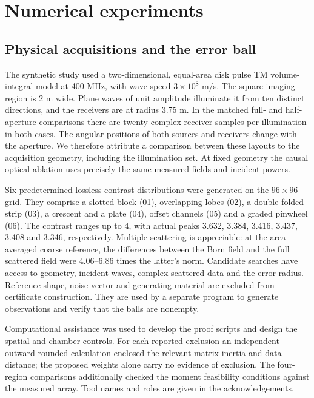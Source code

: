 \documentclass[anonymous,12pt]{iopjournal}
\theoremstyle{remark}\newtheorem{remark}[theorem]{Remark}
\numberwithin{equation}{section}
\begin{document}
\section{Numerical experiments}\label{sec:exp}

\subsection{Physical acquisitions and the error ball}
The synthetic study used a two-dimensional, equal-area disk pulse TM volume-integral model at 400 MHz, with wave speed $3\times10^8$ m/s. The square imaging region is 2 m wide. Plane waves of unit amplitude illuminate it from ten distinct directions, and the receivers are at radius 3.75 m. In the matched full- and half-aperture comparisons there are twenty complex receiver samples per illumination in both cases. The angular positions of both sources and receivers change with the aperture. We therefore attribute a comparison between these layouts to the acquisition geometry, including the illumination set. At fixed geometry the causal optical ablation uses precisely the same measured fields and incident powers.

Six predetermined lossless contrast distributions were generated on the $96\times96$ grid. They comprise a slotted block (01), overlapping lobes (02), a double-folded strip (03), a crescent and a plate (04), offset channels (05) and a graded pinwheel (06). The contrast ranges up to 4, with actual peaks 3.632, 3.384, 3.416, 3.437, 3.408 and 3.346, respectively. Multiple scattering is appreciable: at the area-averaged coarse reference, the differences between the Born field and the full scattered field were 4.06--6.86 times the latter's norm. Candidate searches have access to geometry, incident waves, complex scattered data and the error radius. Reference shape, noise vector and generating material are excluded from certificate construction. They are used by a separate program to generate observations and verify that the balls are nonempty.

Computational assistance was used to develop the proof scripts and design the spatial and chamber controls. For each reported exclusion an independent outward-rounded calculation enclosed the relevant matrix inertia and data distance; the proposed weights alone carry no evidence of exclusion. The four-region comparisons additionally checked the moment feasibility conditions against the measured array. Tool names and roles are given in the acknowledgements.
\end{document}
